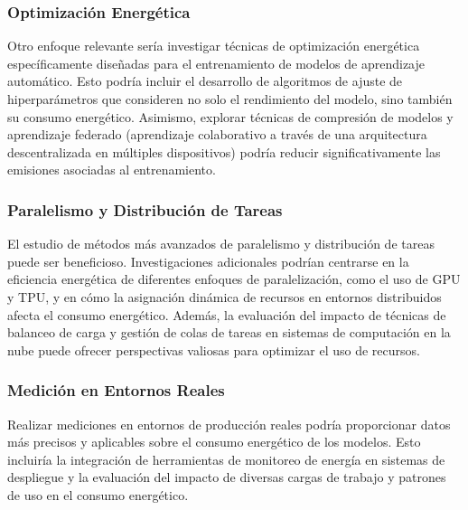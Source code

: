 \subsubsection{Optimización Energética}
Otro enfoque relevante sería investigar técnicas de optimización energética específicamente diseñadas para el entrenamiento de modelos de aprendizaje automático. Esto podría incluir el desarrollo de algoritmos de ajuste de hiperparámetros que consideren no solo el rendimiento del modelo, sino también su consumo energético. Asimismo, explorar técnicas de compresión de modelos y aprendizaje federado (aprendizaje colaborativo a través de una arquitectura descentralizada en múltiples dispositivos) podría reducir significativamente las emisiones asociadas al entrenamiento.

\subsubsection{Paralelismo y Distribución de Tareas}
El estudio de métodos más avanzados de paralelismo y distribución de tareas puede ser beneficioso. Investigaciones adicionales podrían centrarse en la eficiencia energética de diferentes enfoques de paralelización, como el uso de GPU y TPU, y en cómo la asignación dinámica de recursos en entornos distribuidos afecta el consumo energético. Además, la evaluación del impacto de técnicas de balanceo de carga y gestión de colas de tareas en sistemas de computación en la nube puede ofrecer perspectivas valiosas para optimizar el uso de recursos.

\subsubsection{Medición en Entornos Reales}
Realizar mediciones en entornos de producción reales podría proporcionar datos más precisos y aplicables sobre el consumo energético de los modelos. Esto incluiría la integración de herramientas de monitoreo de energía en sistemas de despliegue y la evaluación del impacto de diversas cargas de trabajo y patrones de uso en el consumo energético.
